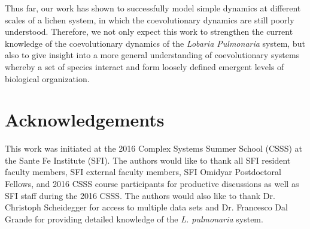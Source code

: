 \documentclass[fleqn,10pt]{wlscirep}
\begin{document}
Thus far, our work has shown to successfully model simple dynamics at different scales of a lichen system, in which the coevolutionary dynamics are still poorly understood. Therefore, we not only expect this work to strengthen the current knowledge of the coevolutionary dynamics of the \emph{Lobaria Pulmonaria} system, but also to give insight into a more general understanding of coevolutionary systems whereby a set of species interact and form loosely defined emergent levels of biological organization. 


\section*{Acknowledgements}
This work was initiated at the 2016 Complex Systems Summer School (CSSS) at the Sante Fe Institute (SFI). The authors would like to thank all SFI resident faculty members, SFI external faculty members, SFI Omidyar Postdoctoral Fellows, and 2016 CSSS course participants for productive discussions as well as SFI staff during the 2016 CSSS. The authors would also like to thank Dr. Christoph Scheidegger for access to multiple data sets and Dr. Francesco Dal Grande for providing detailed knowledge of the \emph{L. pulmonaria} system. 


\end{document}
